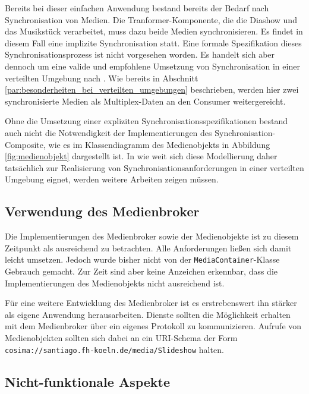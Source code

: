   Bereits bei dieser einfachen Anwendung bestand bereits der Bedarf nach Synchronisation von Medien. Die Tranformer-Komponente, die die Diashow und das Musikstück verarbeitet, muss dazu beide Medien synchronisieren. Es findet in diesem Fall eine implizite Synchronisation statt. Eine formale Spezifikation dieses Synchronisationsprozess ist nicht vorgesehen worden. Es handelt sich aber dennoch um eine valide und empfohlene Umsetzung von Synchronisation in einer verteilten Umgebung nach \citep[S. 609]{multimedia_technologie}. Wie bereits in Abschnitt \ref{par:besonderheiten_bei_verteilten_umgebungen} beschrieben, werden hier zwei synchronisierte Medien als Multiplex-Daten an den Consumer weitergereicht.
  
  Ohne die Umsetzung einer expliziten Synchronisationsspezifikationen bestand auch nicht die Notwendigkeit der Implementierungen des Synchronisation-Composite, wie es im Klassendiagramm des Medienobjekts in Abbildung \ref{fig:medienobjekt} dargestellt ist. In wie weit sich diese Modellierung daher tatsächlich zur Realisierung von Synchronisationsanforderungen in einer verteilten Umgebung eignet, werden weitere Arbeiten zeigen müssen.


\subsection{Verwendung des Medienbroker} %
\label{sub:verwendung_des_medienbroker}

  Die Implementierungen des Medienbroker sowie der Medienobjekte ist zu diesem Zeitpunkt als ausreichend zu betrachten. Alle Anforderungen ließen sich damit leicht umsetzen. Jedoch wurde bisher nicht von der \verb!MediaContainer!-Klasse Gebrauch gemacht. Zur Zeit sind aber keine Anzeichen erkennbar, dass die Implementierungen des Medienobjekts nicht ausreichend ist.
  
  Für eine weitere Entwicklung des Medienbroker ist es erstrebenswert ihn stärker als eigene Anwendung herausarbeiten. Dienste sollten die Möglichkeit erhalten mit dem Medienbroker über ein eigenes Protokoll zu kommunizieren. Aufrufe von Medienobjekten sollten sich dabei an ein URI-Schema der Form \verb!cosima://santiago.fh-koeln.de/media/Slideshow! halten.


\subsection{Nicht-funktionale Aspekte} %
\label{sub:nicht_funktionale_aspekte}

